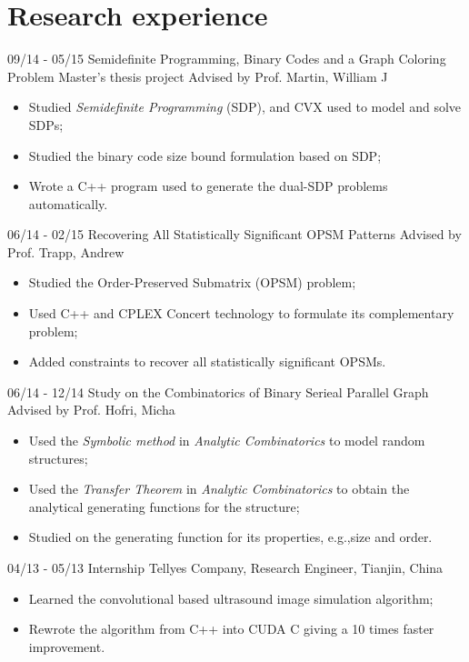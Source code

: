 \documentclass[]{friggeri-cv}
\begin{document}
\section{Research experience}
\begin{entrylist}
	\entry
	{09/14 - 05/15}
	{Semidefinite Programming, Binary Codes and a Graph Coloring Problem}
	{Master's thesis project Advised by Prof. Martin, William J}
	{
		\vspace{-3mm}
		\begin{itemize}
			\item Studied {\em Semidefinite Programming} (SDP), and CVX used to model
				and solve SDPs;
			\item Studied the binary code size bound formulation based on SDP;
			\item Wrote a C++ program used to generate the dual-SDP problems
				automatically.\\
		\end{itemize}
	}
	\entry
	{06/14 - 02/15}
	{Recovering All Statistically Significant OPSM Patterns}
	{Advised by Prof. Trapp, Andrew}
	{
		\vspace{-3mm}
		\begin{itemize}
			\item Studied the Order-Preserved Submatrix (OPSM) problem;
			\item Used C++ and CPLEX Concert technology to formulate its complementary problem;
			\item Added constraints to recover all statistically significant OPSMs.\\
		\end{itemize}
	}
	\entry
	{06/14 - 12/14}
	{Study on the Combinatorics of Binary Serieal Parallel Graph}
	{Advised by Prof. Hofri, Micha}
	{
		\vspace{-3mm}
		\begin{itemize}
			\item Used the \emph{Symbolic method} in {\em Analytic Combinatorics} to
				model random structures;
			\item Used the \emph{Transfer Theorem} in {\em Analytic Combinatorics} to
				obtain the analytical generating functions for the structure;
			\item Studied on the generating function for its properties, e.g.,size and
				order.\\
		\end{itemize}
	}
\end{entrylist}
\begin{entrylist}
	\entry
	{04/13 - 05/13}
	{Internship}
	{Tellyes Company, Research Engineer, Tianjin, China}
	{
		\vspace{-3mm}
		\begin{itemize}
			\item Learned the convolutional based ultrasound image simulation
				algorithm;
			\item Rewrote the algorithm from C++ into CUDA C giving a 10 times faster
				improvement.
		\end{itemize}
	}
\end{entrylist}
\end{document}
